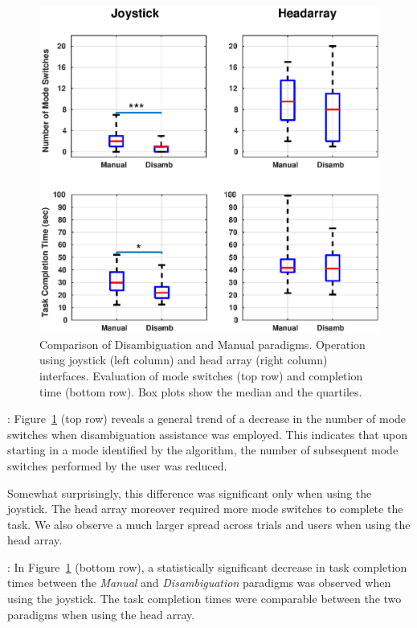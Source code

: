 \documentclass[conference]{IEEEtran}
\begin{document}
\begin{figure}[t]
	\centering
	\includegraphics[width = 1.12\hsize ,center]{./figures/FINAL_BOX_PLOT_8.eps}
	\vspace{-0.7cm}
	\caption{Comparison of Disambiguation and Manual paradigms. Operation using joystick (left column) and head array (right column) interfaces. Evaluation of mode switches (top row) and completion time (bottom row). Box plots show the median and the quartiles.}
	\label{DATAPLOT}
\end{figure}

\vspace{0.1cm}
: Figure~\ref{DATAPLOT} (top row) reveals a general trend of a decrease in the number of mode switches when disambiguation assistance was employed. This indicates that upon starting in a mode identified by the algorithm, the number of subsequent mode switches performed by the user was reduced.
 
Somewhat surprisingly, this difference was significant only when using the joystick. The head array moreover required more mode switches to complete the task. We also observe a much larger spread across trials and users when using the head array.

\vspace{0.1cm}
: 
In Figure~\ref{DATAPLOT} (bottom row), a statistically significant decrease in task completion times between the \textit{Manual} and \textit{Disambiguation} paradigms was observed when using the joystick. The task completion times were comparable between the two paradigms when using the head array.
\end{document}
